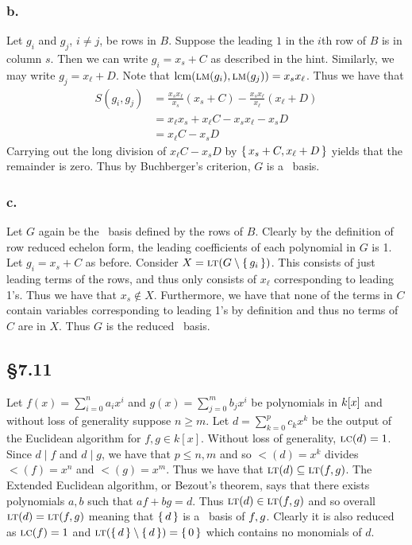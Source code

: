 \documentclass[letterpaper]{article}
\begin{document}
\subsubsection*{b.}

Let $g_{i}$ and $g_{j}$, $i \neq j$, be rows in $B$.
Suppose the leading $1$ in the $i$th row of $B$ is in column $s$.
Then we can write $g_{i} = x_{s} + C$ as described in the hint.
Similarly, we may write $g_{j} = x_{\ell} + D$.
Note that $\operatorname{lcm}(\operatorname{\textsc{lm}}(g_{i}), \operatorname{\textsc{lm}}(g_{j})) = x_{s}x_{\ell}$.
Thus we have that
\begin{align*}
  S(g_{i}, g_{j}) &= \frac{x_{s} x_{\ell}}{x_{s}}(x_{s} + C) - \frac{x_{s} x_{\ell}}{x_{\ell}} (x_{\ell} + D) \\
                  &= x_{\ell}x_{s} + x_{\ell} C - x_{s} x_{\ell} - x_{s} D \\
                  &= x_{\ell} C - x_{s} D
\end{align*}
Carrying out the long division of $x_{\ell} C - x_{s} D$ by $\set{x_{s} + C, x_{\ell} + D}$ yields that the remainder is zero.
Thus by Buchberger's criterion, $G$ is a \Grobner\ basis.

\subsubsection*{c.}

Let $G$ again be the \Grobner\ basis defined by the rows of $B$.
Clearly by the definition of row reduced echelon form, the leading coefficients of each polynomial in $G$ is 1.
Let $g_{i} = x_{s} + C$ as before.
Consider $X = \gen{\lt(G \setminus \set{g_{i}})}$.
This consists of just leading terms of the rows, and thus only consists of $x_{\ell}$ corresponding to leading 1's.
Thus we have that $x_{s} \notin X$.
Furthermore, we have that none of the terms in $C$ contain variables corresponding to leading 1's by definition and thus no terms of $C$ are in $X$.
Thus $G$ is the reduced \Grobner\ basis.

\subsection*{\S 7.11}

Let $f(x) = \sum_{i = 0}^{n} a_{i}x^{i}$ and $g(x) = \sum_{j = 0}^{m} b_{j} x^{i}$ be polynomials in $k\bqty{x}$ and without loss of generality suppose $n \geq m$.
Let $d = \sum_{k = 0}^{p} c_{k} x^{k}$ be the output of the Euclidean algorithm for $f, g \in k[x]$.
Without loss of generality, $\operatorname{\textsc{lc}}(d) = 1$.
Since $d \mid f$ and $d \mid g$, we have that $p \leq n, m$ and so $\lt(d) = x^{k}$ divides $\lt(f) = x^{n}$ and $\lt(g) = x^{m}$.
Thus we have that $\ideal{\lt(d)} \subseteq \ideal{\lt(\ideal{f, g})}$.
The Extended Euclidean algorithm, or Bezout's theorem, says that there exists polynomials $a, b$ such that $af + bg = d$.
Thus $\lt(d) \in \ideal{\lt(\ideal{f, g})}$ and so overall $\ideal{\lt(d)} = \ideal{\lt(\ideal{f, g})}$ meaning that $\set{d}$ is a \Grobner\ basis of $\ideal{f, g}$.
Clearly it is also reduced as $\operatorname{\textsc{lc}}(f) = 1$ and $\ideal{\lt(\set{d} \setminus \set{d})} = \set{0}$ which contains no monomials of $d$.
\end{document}
